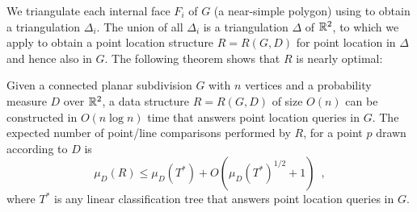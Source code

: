\documentclass[acmtalg]{acmsmall}
\begin{document}
We triangulate each internal face $F_i$ of $G$ (a near-simple polygon)
using  to obtain a triangulation
$\Delta_i$. The union of all $\Delta_i$
is a triangulation $\Delta$ of $\mathbb{R}^2$, to which we apply
 to obtain a point location structure $R=R(G,D)$ for
point location in $\Delta$ and hence also in $G$.  The following
theorem shows that $R$ is nearly optimal:

\begin{thm}
Given a connected planar subdivision $G$ with $n$ vertices and a probability
measure $D$ over $\mathbb{R}^2$, a data structure $R=R(G,D)$ of size $O(n)$ can be
constructed in $O(n\log n)$ time that answers point location queries in $G$.
The expected number of point/line comparisons performed by $R$, 
for a point $p$ drawn according to $D$ is 
\[
  \mu_D(R) \le \mu_D(T^*) + O(\mu_D(T^*)^{1/2}+1) \enspace , 
\] 
where $T^*$ is any linear classification tree that answers point
location queries in $G$.
\end{thm}
\end{document}
